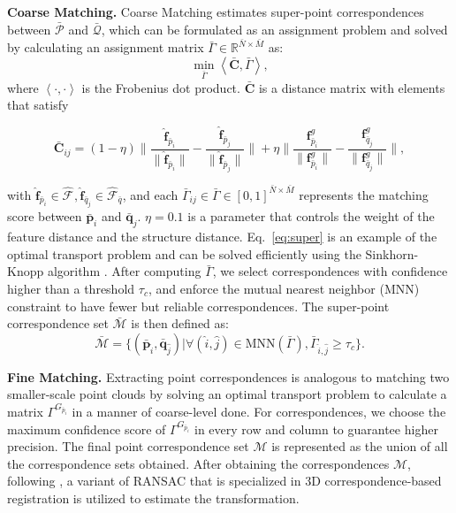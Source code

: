 \noindent \textbf{Coarse Matching.}
Coarse Matching estimates super-point correspondences between $\bm{\bar{\mathcal{P}}}$ and $\bm{\bar{\mathcal{Q}}}$, which can be formulated as an assignment problem and solved by calculating an assignment matrix $\bar{\Gamma}\in \mathbb{R}^{\bar{N}\times \bar{M}}$ as:
\begin{equation}\label{eq:super}
\min_{\bar{\Gamma}}\left<\bar{\bm{C}}, \bar{\Gamma}\right>, 
\end{equation}
where $\left<\cdot, \cdot\right> $ is the Frobenius dot product. 
$\bar{\bm{C}}$ is a distance matrix with elements that satisfy 
\begin{small}
\begin{equation*}
\bar{\bm{C}}_{ij}=(1-\eta)\|\frac{\hat{\bm{f}}_{\bar{p}_i}}{\|\hat{\bm{f}}_{\bar{p}_i}\|}-\frac{\hat{\bm{f}}_{\bar{p}_j}}
{\|\hat{\bm{f}}_{\bar{p}_j}\|}\|
+
\eta\|\frac{\bm{f}^g_{\bar{p}_i}}{\|\bm{f}^g_{\bar{p}_i}\|}-\frac{{\bm{f}}^g_{\bar{q}_j}}{\|\bm{f}^g_{\bar{q}_j}\|}\|,
\end{equation*}
\end{small}
with  $\hat{\bm{f}}_{\bar{p}_i}\in\hat{\bm{\mathcal{F}}}_{},\hat{\bm{f}}_{\bar{q}_j}\in\hat{\bm{\mathcal{F}}}_{\bar{q}}$, and each $\bar{\Gamma}_{ij} \in \bar{\Gamma}\in[0,1]^{\bar{N}\times \bar{M}}$ represents the matching score between $\bm{\bar{p}}_i$ and $\bm{\bar{q}}_j$.
$\eta=0.1$ is a parameter that controls the weight of the feature distance and the structure distance.
Eq.~\eqref{eq:super} is an example of the optimal transport problem \cite{cuturi2013sinkhorn} and can be solved efficiently using the Sinkhorn-Knopp algorithm \cite{cuturi2013sinkhorn}.
After computing $\bar{\Gamma}$, we select correspondences with confidence higher than a threshold $\tau_c$, and enforce the mutual nearest neighbor (MNN) constraint to have fewer but reliable correspondences. 
The super-point correspondence set $\mathcal{\bar{M}}$ is then defined as:
\begin{equation}\label{eq:sset}
	\mathcal{\bar{M}}=\{(\bm{\bar{p}}_{\hat{i}},\bm{\bar{q}}_{\hat{j}})\big|\forall(\hat{i},\hat{j})\in \mbox{MNN}(\bar{\Gamma}), \bar{\Gamma}_{\hat{i},\hat{j}}\geq\tau_c\}.
\end{equation}




\noindent \textbf{Fine Matching.}
Extracting point correspondences is analogous to matching two smaller-scale point clouds by solving an optimal transport problem to calculate a matrix $\Gamma^{G_{\bar{p}_i}}$ in a manner of coarse-level done.
For correspondences, we choose the maximum confidence score of $\Gamma^{G_{\bar{p}_i}}$ in every row and column to guarantee higher precision. The final point correspondence set $\mathcal{M}$ is represented as the union of all the correspondence sets obtained. After obtaining the correspondences $\mathcal{M}$, following \cite{qin2022geometric,yu2021cofinet},  a variant of RANSAC \cite{fischler1981random} that is specialized in 3D correspondence-based registration \cite{zhou2018open3d} is utilized to estimate the transformation.

